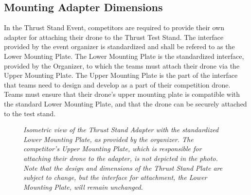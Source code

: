 \documentclass{article}
\begin{document}
\subsection{Mounting Adapter Dimensions}
In the Thrust Stand Event, competitors are required to provide their own adapter for attaching their drone to the Thrust Test Stand. The interface provided by the event organizer is standardized and shall be refered to as the Lower Mounting Plate. The Lower Mounting Plate is the standardized interface, provided by the Organizer, to which the teams must attach their drone via the Upper Mounting Plate. The Upper Mounting Plate is the part of the interface that teams need to design and develop as a part of their competition drone. Teams must ensure that their drone's upper mounting plate is compatible with the standard Lower Mounting Plate, and that the drone can be securely attached to the test stand. 
\begin{figure}
  \centering
 \caption{\textit{Isometric view of the Thrust Stand Adapter with the standardized Lower Mounting Plate, as provided by the organizer. The competitor's Upper Mounting Plate, which is responsible for attaching their drone to the adapter, is not depicted in the photo. Note that the design and dimensions of the Thrust Stand Plate are subject to change, but the interface for attachment, the Lower Mounting Plate, will remain unchanged.}}
 \end{figure}
\end{document}
